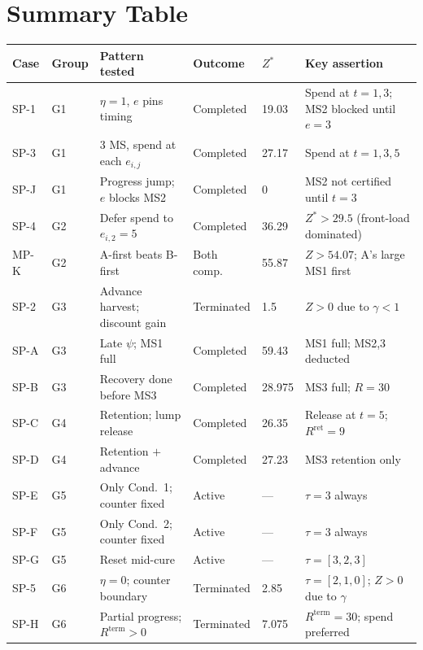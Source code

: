 \documentclass[11pt, a4paper]{article}
\begin{document}
\section{Summary Table}

\begin{longtable}{p{1.1cm}p{1.3cm}p{3.5cm}p{1.8cm}p{1.4cm}p{3.8cm}}
\toprule
\textbf{Case} & \textbf{Group} & \textbf{Pattern tested} &
\textbf{Outcome} & \textbf{$Z^*$} & \textbf{Key assertion}\\
\midrule
\endhead
SP-1  & G1 & $\eta=1$, $e$ pins timing & Completed & 19.03 &
  Spend at $t=1,3$; MS2 blocked until $e=3$\\
SP-3  & G1 & 3 MS, spend at each $e_{i,j}$ & Completed & 27.17 &
  Spend at $t=1,3,5$\\
SP-J  & G1 & Progress jump; $e$ blocks MS2 & Completed & 0 &
  MS2 not certified until $t=3$\\
SP-4  & G2 & Defer spend to $e_{i,2}=5$ & Completed & 36.29 &
  $Z^*>29.5$ (front-load dominated)\\
MP-K  & G2 & A-first beats B-first & Both comp. & 55.87 &
  $Z>54.07$; A's large MS1 first\\
SP-2  & G3 & Advance harvest; discount gain & Terminated & 1.5 &
  $Z>0$ due to $\gamma<1$\\
SP-A  & G3 & Late $\psi$; MS1 full & Completed & 59.43 &
  MS1 full; MS2,3 deducted\\
SP-B  & G3 & Recovery done before MS3 & Completed & 28.975 &
  MS3 full; $R=30$\\
SP-C  & G4 & Retention; lump release & Completed & 26.35 &
  Release at $t=5$; $R^{\mathrm{ret}}=9$\\
SP-D  & G4 & Retention $+$ advance & Completed & 27.23 &
  MS3 retention only\\
SP-E  & G5 & Only Cond.~1; counter fixed & Active & --- &
  $\tau=3$ always\\
SP-F  & G5 & Only Cond.~2; counter fixed & Active & --- &
  $\tau=3$ always\\
SP-G  & G5 & Reset mid-cure & Active & --- &
  $\tau=[3,2,3]$\\
SP-5  & G6 & $\eta=0$; counter boundary & Terminated & 2.85 &
  $\tau=[2,1,0]$; $Z>0$ due to $\gamma$\\
SP-H  & G6 & Partial progress; $R^{\mathrm{term}}>0$ & Terminated & 7.075 &
  $R^{\mathrm{term}}=30$; spend preferred\\

\end{longtable}
\end{document}
